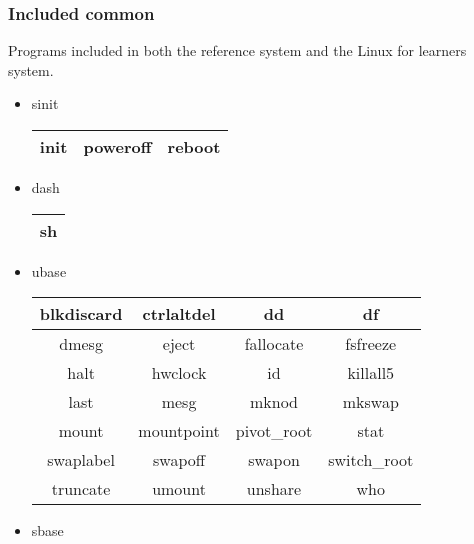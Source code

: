 \subsubsection{Included common}

Programs included in both the reference system and the Linux for learners system.

\begin{itemize}
    \item sinit
        \begin{center}
            \begin{tabular}{|c|c|c|}
                \hline
                init & poweroff & reboot \\
                \hline
            \end{tabular}
        \end{center}
    \item dash
        \begin{center}
            \begin{tabular}{|c|}
                \hline
                sh \\
                \hline
            \end{tabular}
        \end{center}
    \item ubase
        \begin{center}
            \begin{tabular}{|c|c|c|c|}
                \hline
                blkdiscard & ctrlaltdel & dd & df \\
                \hline
                dmesg & eject & fallocate & fsfreeze \\
                \hline
                halt & hwclock & id & killall5 \\
                \hline
                last & mesg & mknod & mkswap \\
                \hline
                mount & mountpoint & pivot\_root & stat \\
                \hline
                swaplabel & swapoff & swapon & switch\_root \\
                \hline
                truncate & umount & unshare & who \\
                \hline
            \end{tabular}
        \end{center}
    \item sbase
        \begin{center}
            \begin{tabular}{|c|c|c|c|}

\end{tabular}
\end{center}
\end{itemize}
